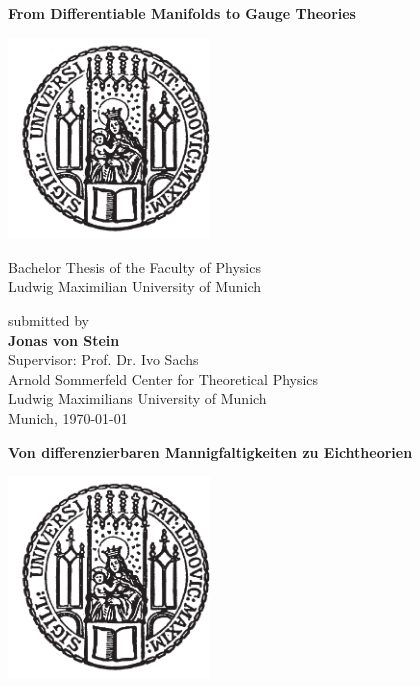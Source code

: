 \documentclass[a4paper,11pt,twoside,openright]{report}
\newcommand{\thesistitleEng}{From Differentiable Manifolds to Gauge Theories}
\newcommand{\thesistitleDe}{Von differenzierbaren Mannigfaltigkeiten zu Eichtheorien}
\newcommand{\authorname}{Jonas von Stein}
\newcommand{\thesisdate}{\today}
\begin{document}
\pagestyle{empty}
\begin{titlepage}
  \begin{center}
    \vspace*{0.65cm}
    \huge
    \hspace*{-0.73cm}
    \textbf{\thesistitleEng}\\
    \vspace*{2.2cm}

    \includegraphics[width=0.4\textwidth]{figures/lmu_siege1.pdf}

    \vspace*{0.5cm}
    \Large
    Bachelor Thesis of the Faculty of Physics\\
    Ludwig Maximilian University of Munich

    \vspace*{1.5cm}
    \large
    submitted by\\[0.1cm]
    \Large \textbf{\authorname}\\

    \vfill
    \large
    Supervisor: Prof. Dr. Ivo Sachs\\[0.1cm]
    Arnold Sommerfeld Center for Theoretical Physics \\[0.1cm]
    Ludwig Maximilians University of Munich\\
    \vspace*{1.5cm}
    Munich, \thesisdate
  \end{center}

\cleardoublepage

  \begin{center}
    \vspace*{0.65cm}
    \huge
    \hspace*{-0.73cm}
    \textbf{\thesistitleDe}\\
    \vspace*{2.2cm}

    \includegraphics[width=0.4\textwidth]{figures/lmu_siege1.pdf}


\end{center}
\end{titlepage}
\end{document}
